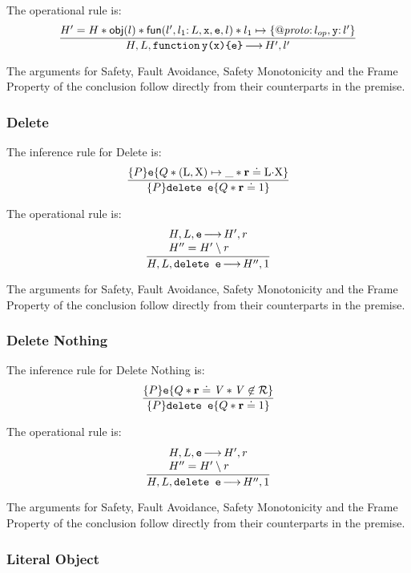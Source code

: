 \documentclass{article}
\begin{document}
The operational rule is:
\[\frac
{H' = H \sep \obj(l)\sep \func(l',l_1\ty L,\js x,\js e,l) \sep l_1\pointsto\{\protop\ty \lop,\js{y}\ty l'\}}
{H,L,\jsfun[y]{x}{e} \levalsto H',l'}
\]

The arguments for Safety, Fault Avoidance, Safety Monotonicity and the Frame Property of the conclusion follow directly from their counterparts in the premise.

\subsubsection{Delete}

The inference rule for Delete is:
\[\frac
{\tr P {\js e} {Q \sep (\V{L},\V{X})\pointsto\_ \sep \rv\doteq\V{L}\sv\V{X}}}
{\tr  P {\js{delete e}} {Q \sep\rv\doteq 1}}
\]

The operational rule is:
\[\frac
{\begin{array}{l}H,L,\js{e} \levalsto H',\njs{r}\\%
        H'' = H'\setminus \njs{r}\end{array}}%
{H,L,\js{delete e} \levalsto H'',1}
\]

The arguments for Safety, Fault Avoidance, Safety Monotonicity and the Frame Property of the conclusion follow directly from their counterparts in the premise.

\subsubsection{Delete Nothing}

The inference rule for Delete Nothing is:
\[\frac
{\tr P {\js e} { Q \sep \rv\doteq\E{V} \sep \E{V}\not\in\refs}}
{\tr P {\js{delete e}} { Q \sep\rv\doteq 1 }}
\]

The operational rule is:
\[\frac
{\begin{array}{l}H,L,\js{e} \levalsto H',\njs{r}\\%
        H'' = H'\setminus \njs{r}\end{array}}%
{H,L,\js{delete e} \levalsto H'',1}
\]

The arguments for Safety, Fault Avoidance, Safety Monotonicity and the Frame Property of the conclusion follow directly from their counterparts in the premise.

\subsubsection{Literal Object}
\end{document}
